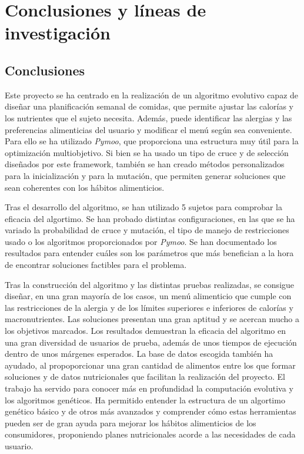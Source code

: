 \chapter{Conclusiones y líneas de investigación}
\label{ch:conclusiones}

\section{Conclusiones}
Este proyecto se ha centrado en la realización de un algoritmo evolutivo capaz de diseñar una planificación semanal de comidas, que permite ajustar las calorías y los nutrientes que el sujeto necesita. Además, puede identificar las alergias y las preferencias alimenticias del usuario y modificar el menú según sea conveniente. Para ello se ha utilizado \textit{Pymoo}, que proporciona una estructura muy útil para la optimización multiobjetivo. Si bien se ha usado un tipo de cruce y de selección diseñados por este framework, también se han creado métodos personalizados para la inicialización y para la mutación, que permiten generar soluciones que sean coherentes con los hábitos alimenticios.

Tras el desarrollo del algoritmo, se han utilizado 5 sujetos para comprobar la eficacia del algortimo. Se han probado distintas configuraciones, en las que se ha variado la probabilidad de cruce y mutación, el tipo de manejo de restricciones usado o los algoritmos proporcionados por \textit{Pymoo}. Se han documentado los resultados para entender cuáles son los parámetros que más benefician a la hora de encontrar soluciones factibles para el problema.

Tras la construcción del algoritmo y las distintas pruebas realizadas, se consigue diseñar, en una gran mayoría de los casos, un menú alimenticio que cumple con las restricciones de la alergia y de los límites superiores e inferiores de calorías y macronutrientes. Las soluciones presentan una gran aptitud y se acercan mucho a los objetivos marcados. Los resultados demuestran la eficacia del algoritmo en una gran diversidad de usuarios de prueba, además de unos tiempos de ejecución dentro de unos márgenes esperados. La base de datos escogida también ha ayudado, al propoporcionar una gran cantidad de alimentos entre los que formar soluciones y de datos nutricionales que facilitan la realización del proyecto.
\newpage
El trabajo ha servido para conocer más en profundidad la computación evolutiva y los algoritmos genéticos. Ha permitido entender la estructura de un algortimo genético básico y de otros más avanzados y comprender cómo estas herramientas pueden ser de gran ayuda para mejorar los hábitos alimenticios de los consumidores, proponiendo planes nutricionales acorde a las necesidades de cada usuario.

